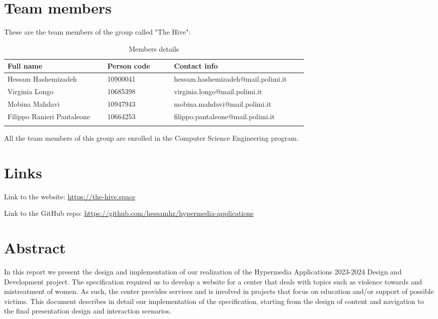 \section{Team members}
These are the team members of the group called "The Hive":
\begin{longtable}
    {|m{0.3\linewidth}|m{0.2\linewidth}|m{0.4\linewidth}|}
            \hline
            \textbf{Full name} & \textbf{Person code} & \textbf{Contact info}\\
            \hline
            \endhead
                Hessam Hashemizadeh & 10900041 & hessam.hashemizadeh@mail.polimi.it \\
            \hline
                Virginia Longo & 10685398 & virginia.longo@mail.polimi.it \\
            \hline
                Mobina Mahdavi & 10947943 & mobina.mahdavi@mail.polimi.it \\
            \hline
                Filippo Ranieri Pantaleone & 10664253 & filippo.pantaleone@mail.polimi.it \\
            \hline
            \caption{Members details}
            \label{table:mem_details}
\end{longtable}

All the team members of this group are enrolled in the Computer Science Engineering program.

\section{Links}
Link to the website: \url{https://the-hive.space}

Link to the GitHub repo: \url{https://github.com/hessamhz/hypermedia-applications}

\section{Abstract}
In this report we present the design and implementation of our realization of the Hypermedia Applications 2023-2024 Design and Development project. The specification required us to develop a website for a center that deals with topics such as violence towards and mistreatment of women. As such, the center provides services and is involved in projects that focus on education and/or support of possible victims. This document describes in detail our implementation of the specification, starting from the design of content and navigation to the final presentation design and interaction scenarios.
